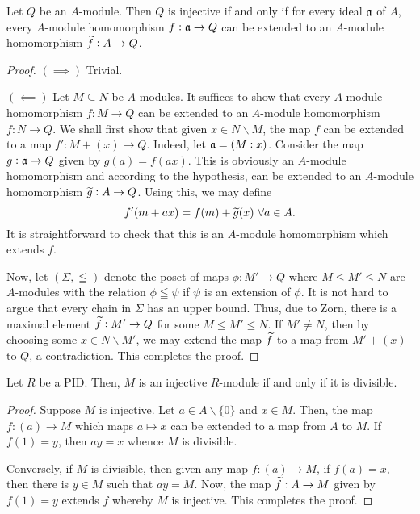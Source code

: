 \begin{theorem}
    Let $Q$ be an $A$-module. Then $Q$ is injective if and only if for every ideal $\mathfrak a$ of $A$, every $A$-module homomorphism $f:\mathfrak a\to Q$ can be extended to an $A$-module homomorphism $\widetilde{f}: A\to Q$.
\end{theorem}
\begin{proof}
    $(\implies)$ Trivial.

    $(\impliedby)$ Let $M\subseteq N$ be $A$-modules. It suffices to show that every $A$-module homomorphism $f: M\to Q$ can be extended to an $A$-module homomorphism $f: N\to Q$. We shall first show that given $x\in N\backslash M$, the map $f$ can be extended to a map $f': M + (x)\to Q$. Indeed, let $\mathfrak a = (M : x)$. Consider the map $g:\mathfrak a\to Q$ given by $g(a) = f(ax)$. This is obviously an $A$-module homomorphism and according to the hypothesis, can be extended to an $A$-module homomorphism $\widetilde{g}: A\to Q$. Using this, we may define 
    \begin{equation*}
        f'(m + ax) = f(m) + \widetilde{g}(x)~\forall a\in A.
    \end{equation*}
    It is straightforward to check that this is an $A$-module homomorphism which extends $f$.

    Now, let $(\Sigma,\leqq)$ denote the poset of maps $\phi: M'\to Q$ where $M\le M'\le N$ are $A$-modules with the relation $\phi\leqq\psi$ if $\psi$ is an extension of $\phi$. It is not hard to argue that every chain in $\Sigma$ has an upper bound. Thus, due to Zorn, there is a maximal element $\widetilde{f}: M'\to Q$ for some $M\le M'\le N$. If $M'\ne N$, then by choosing some $x\in N\backslash M'$, we may extend the map $\widetilde{f}$ to a map from $M' + (x)$ to $Q$, a contradiction. This completes the proof.
\end{proof}

\begin{proposition}
    Let $R$ be a PID. Then, $M$ is an injective $R$-module if and only if it is divisible.
\end{proposition}
\begin{proof}
    Suppose $M$ is injective. Let $a\in A\backslash\{0\}$ and $x\in M$. Then, the map $f:(a)\to M$ which maps $a\mapsto x$ can be extended to a map from $A$ to $M$. If $f(1) = y$, then $ay = x$ whence $M$ is divisible.

    Conversely, if $M$ is divisible, then given any map $f: (a)\to M$, if $f(a) = x$, then there is $y\in M$ such that $ay = M$. Now, the map $\widetilde{f}: A\to M$ given by $f(1) = y$ extends $f$ whereby $M$ is injective. This completes the proof.
\end{proof}

